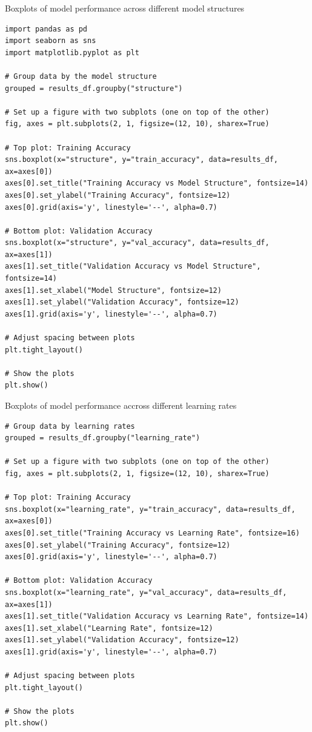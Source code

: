 \documentclass[a4paper]{article}
\begin{document}
Boxplots of model performance across different model structures
\begin{lstlisting}
import pandas as pd
import seaborn as sns
import matplotlib.pyplot as plt

# Group data by the model structure
grouped = results_df.groupby("structure")

# Set up a figure with two subplots (one on top of the other)
fig, axes = plt.subplots(2, 1, figsize=(12, 10), sharex=True)

# Top plot: Training Accuracy
sns.boxplot(x="structure", y="train_accuracy", data=results_df, ax=axes[0])
axes[0].set_title("Training Accuracy vs Model Structure", fontsize=14)
axes[0].set_ylabel("Training Accuracy", fontsize=12)
axes[0].grid(axis='y', linestyle='--', alpha=0.7)

# Bottom plot: Validation Accuracy
sns.boxplot(x="structure", y="val_accuracy", data=results_df, ax=axes[1])
axes[1].set_title("Validation Accuracy vs Model Structure", fontsize=14)
axes[1].set_xlabel("Model Structure", fontsize=12)
axes[1].set_ylabel("Validation Accuracy", fontsize=12)
axes[1].grid(axis='y', linestyle='--', alpha=0.7)

# Adjust spacing between plots
plt.tight_layout()

# Show the plots
plt.show()
\end{lstlisting}


Boxplots of model performance accross different learning rates
\begin{lstlisting}
# Group data by learning rates
grouped = results_df.groupby("learning_rate")

# Set up a figure with two subplots (one on top of the other)
fig, axes = plt.subplots(2, 1, figsize=(12, 10), sharex=True)

# Top plot: Training Accuracy
sns.boxplot(x="learning_rate", y="train_accuracy", data=results_df, ax=axes[0])
axes[0].set_title("Training Accuracy vs Learning Rate", fontsize=16)
axes[0].set_ylabel("Training Accuracy", fontsize=12)
axes[0].grid(axis='y', linestyle='--', alpha=0.7)

# Bottom plot: Validation Accuracy
sns.boxplot(x="learning_rate", y="val_accuracy", data=results_df, ax=axes[1])
axes[1].set_title("Validation Accuracy vs Learning Rate", fontsize=14)
axes[1].set_xlabel("Learning Rate", fontsize=12)
axes[1].set_ylabel("Validation Accuracy", fontsize=12)
axes[1].grid(axis='y', linestyle='--', alpha=0.7)

# Adjust spacing between plots
plt.tight_layout()

# Show the plots
plt.show()
\end{lstlisting}
\end{document}
